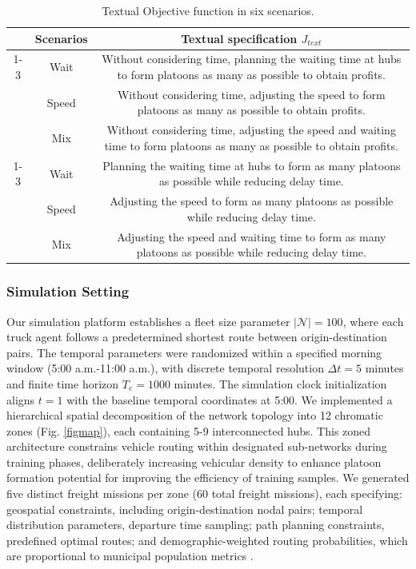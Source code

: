 \documentclass[lettersize,journal]{IEEEtran}
\begin{document}
\begin{table}[t]
\centering
\caption{Textual Objective function in six scenarios.}
\begin{tabular}{ccc}
\toprule
                         & Scenarios      & Textual specification $J_{text}$                                                                                                    \\
                         \cmidrule(r){1-3}
\multirow{3}{*}{Single-Object} & Wait  & Without considering time, planning the waiting time at hubs to form platoons as many as possible to obtain profits.    \\
                         & Speed & Without considering time, adjusting the speed to form platoons as many as possible to obtain profits.                  \\
                         & Mix   & Without considering time, adjusting the speed and waiting time to form platoons as many as possible to obtain profits. \\
                         \cmidrule(r){1-3}
\multirow{3}{*}{Multi-Object} & Wait  & Planning the waiting time at hubs to form as many platoons as possible while reducing delay time.                      \\
                         & Speed & Adjusting the speed to form as many platoons as possible while reducing delay time.                                    \\
                         & Mix   & Adjusting the speed and waiting time to form as many platoons as possible while reducing delay time.                  \\ \bottomrule
\end{tabular}
\end{table}

\subsubsection{Simulation Setting}
Our simulation platform establishes a fleet size parameter \(|\mathcal{N}|=100\), where each truck agent follows a predetermined shortest route between origin-destination pairs.
The temporal parameters were randomized within a specified morning window (5:00 a.m.-11:00 a.m.), with discrete temporal resolution \(\Delta t = 5\) minutes and finite time horizon \(T_e=1000\) minutes. 
The simulation clock initialization aligns \(t=1\) with the baseline temporal coordinates at 5:00.
We implemented a hierarchical spatial decomposition of the network topology into 12 chromatic zones (Fig. \ref{figmap}), each containing 5-9 interconnected hubs. 
This zoned architecture constrains vehicle routing within designated sub-networks during training phases, deliberately increasing vehicular density to enhance platoon formation potential for improving the efficiency of training samples. 
We generated five distinct freight missions per zone (60 total freight missions), each specifying: geospatial constraints, including origin-destination nodal pairs; temporal distribution parameters, departure time sampling; path planning constraints, predefined optimal routes; and demographic-weighted routing probabilities, which are proportional to municipal population metrics \cite{johansson2021strategic}.
\end{document}
